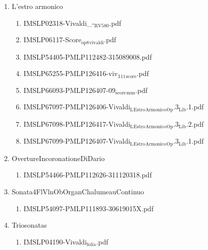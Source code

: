 \documentclass[11pt]{article}
\begin{document}
\begin{enumerate}
\begin{enumerate}
\item L'estro armonico
\label{sec-1-1-1-1-44-72-1-4}
\begin{enumerate}
\item IMSLP02318-Vivaldi\_-$_{\text{RV580}}$.pdf
\label{sec-1-1-1-1-44-72-1-4-1}

\item IMSLP06117-Score$_{\text{op8}}$$_{\text{vivaldi}}$.pdf
\label{sec-1-1-1-1-44-72-1-4-2}

\item IMSLP54405-PMLP112482-315089008.pdf
\label{sec-1-1-1-1-44-72-1-4-3}

\item IMSLP65255-PMLP126416-viv$_{\text{3}}$$_{\text{11}}$$_{\text{score}}$.pdf
\label{sec-1-1-1-1-44-72-1-4-4}

\item IMSLP66093-PMLP126407-09$_{\text{score}}$$_{\text{mus}}$.pdf
\label{sec-1-1-1-1-44-72-1-4-5}

\item IMSLP67097-PMLP126406-Vivaldi$_{\text{L}}$$_{\text{Estro}}$$_{\text{Armonico}}$$_{\text{Op}}$.3$_{\text{Lib}}$.1.pdf
\label{sec-1-1-1-1-44-72-1-4-6}

\item IMSLP67098-PMLP126417-Vivaldi$_{\text{L}}$$_{\text{Estro}}$$_{\text{Armonico}}$$_{\text{Op}}$.3$_{\text{Lib}}$.2.pdf
\label{sec-1-1-1-1-44-72-1-4-7}

\item IMSLP67099-PMLP126407-Vivaldi$_{\text{L}}$$_{\text{Estro}}$$_{\text{Armonico}}$$_{\text{Op}}$.3$_{\text{Lib}}$.1.pdf
\label{sec-1-1-1-1-44-72-1-4-8}
\end{enumerate}

\item OvertureIncoronationeDiDario
\label{sec-1-1-1-1-44-72-1-5}
\begin{enumerate}
\item IMSLP54466-PMLP112626-311120318.pdf
\label{sec-1-1-1-1-44-72-1-5-1}
\end{enumerate}

\item Sonata4FlVlnObOrganChalumeauContinuo
\label{sec-1-1-1-1-44-72-1-6}
\begin{enumerate}
\item IMSLP54097-PMLP111893-30619015X.pdf
\label{sec-1-1-1-1-44-72-1-6-1}
\end{enumerate}

\item Triosonatas
\label{sec-1-1-1-1-44-72-1-7}
\begin{enumerate}
\item IMSLP04190-Vivaldi$_{\text{folia}}$.pdf
\label{sec-1-1-1-1-44-72-1-7-1}
\end{enumerate}
\end{enumerate}


\end{enumerate}
\end{document}
